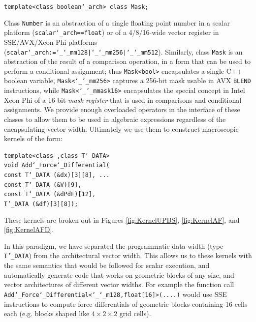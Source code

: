 \begin{shaded}
\texttt{template<class boolean\char`_arch> class Mask;}
\end{shaded}
 Class \texttt{Number} is an abstraction of a single
floating point number in a scalar platform
(\texttt{scalar\char`_arch==float}) or of a 4/8/16-wide vector
register in SSE/AVX/Xeon Phi platforms
(\texttt{scalar\char`_arch:=\char`_\char`_mm128|\char`_\char`_mm256|\char`_\char`_mm512}). Similarly,
class \texttt{Mask} is an abstraction of the result of a comparison
operation, in a form that can be used to perform a conditional
assignment; thus \texttt{Mask<bool>} encapsulates a single C++ boolean
variable, \texttt{Mask<\char`_\char`_mm256>} captures a 256-bit mask
usable in AVX \texttt{BLEND} instructions, while
\texttt{Mask<\char`_\char`_mmask16>} encapsulates the special concept
in Intel Xeon Phi of a 16-bit \emph{mask register} that is used in
comparisons and conditional assignments. We provide enough overloaded
operators in the interface of these classes to allow them to be used
in algebraic expressions regardless of the encapsulating vector
width. Ultimately we use them to construct macroscopic kernels of the
form:
\begin{shaded}
\texttt{template<class ,class T\char`_DATA>}\\
\texttt{void Add\char`_Force\char`_Differential(}\\
\texttt{\hspace*{2em}const T\char`_DATA (\&dx)[3][8], ...}\\
\texttt{\hspace*{2em}const T\char`_DATA (\&V)[9],}\\
\texttt{\hspace*{2em}const T\char`_DATA (\&dPdF)[12],}\\
\texttt{\hspace*{2em}T\char`_DATA (\&df)[3][8]);}
\end{shaded}
These kernels are broken out in Figures \ref{fig:KernelUPBS},
\ref{fig:KernelAF}, and \ref{fig:KernelAFD}.

In this paradigm, we have separated the programmatic
data width (type
\texttt{T\char`_DATA}) from the architectural vector width. This allows us
to these kernels with the same
semantics that would be followed for scalar execution, and
automatically generate code that works on geometric blocks of any
size, and vector architectures of different vector widths. For example
the function call
\texttt{Add\char`_Force\char`_Differential<\char`_\char`_m128,float[16]>(....)}
would use SSE instructions to compute force differentials of geometric
blocks containing 16 cells each (e.g. blocks shaped like
$4\times 2\times 2$ grid cells). 


